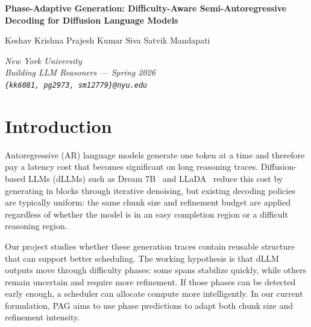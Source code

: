 \documentclass[11pt]{article}
\newcommand{\papertitle}[1]{%
  \begin{center}
    {\LARGE\bfseries #1 \par}
    \vspace{0.3em}
  \end{center}
}
\newcommand{\paperauthor}[1]{%
  \begin{center}
    {\large #1 \par}
    \vspace{0.15em}
  \end{center}
}
\newcommand{\paperaffiliation}[1]{%
  \begin{center}
    {\normalsize\itshape #1 \par}
    \vspace{0.6em}
  \end{center}
}
\begin{document}
\papertitle{Phase-Adaptive Generation: Difficulty-Aware Semi-Autoregressive Decoding for Diffusion Language Models}

\paperauthor{Keshav Krishna \quad Prajesh Kumar \quad Siva Satvik Mandapati}
\paperaffiliation{New York University \\ Building LLM Reasoners --- Spring 2026 \\ \texttt{\{kk6081, pg2973, sm12779\}@nyu.edu}}

\begin{abstract}
Phase-Adaptive Generation (PAG) is an original research project on difficulty-aware decoding for diffusion language models. We first built a baseline pipeline around LLaDA and Dream traces: collect token-level confidence signals (top-1 probability, top-2 probability, entropy, $\tau_{\text{stability}}$, and $\tau_{\text{commit}}$), run change-point detection (CPD), derive segment tuples, and train a next-segment predictor. Through that process, we observed that CPD is useful for analysis but adds an avoidable intermediate step when the training target is block-level controls. Based on these observations, we now prioritize an AdaBlock-centered data path where traces directly provide block size and stabilization-step signals per block. This writeup documents both the attempted pipeline and the revised design decision, together with the current Transformer-based phase predictor and planned model ablations.
\end{abstract}

\section{Introduction}

Autoregressive (AR) language models generate one token at a time and therefore pay a latency cost that becomes significant on long reasoning traces. Diffusion-based LLMs (dLLMs) such as Dream 7B~\citep{ye2025dream} and LLaDA~\citep{nie2025llada} reduce this cost by generating in blocks through iterative denoising, but existing decoding policies are typically uniform: the same chunk size and refinement budget are applied regardless of whether the model is in an easy completion region or a difficult reasoning region.

Our project studies whether these generation traces contain reusable structure that can support better scheduling. The working hypothesis is that dLLM outputs move through difficulty phases: some spans stabilize quickly, while others remain uncertain and require more refinement. If those phases can be detected early enough, a scheduler can allocate compute more intelligently. In our current formulation, PAG aims to use phase predictions to adapt both chunk size and refinement intensity.
\end{document}
